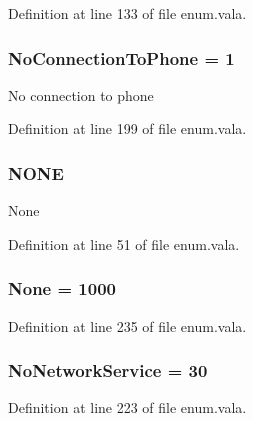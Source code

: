 Definition at line 133 of file enum.\-vala.

\hypertarget{enum_8vala_a3ae63a7c17bbbdb719add34f0b8e1d38}{
\subsubsection[{No\-Connection\-To\-Phone}]{\setlength{\rightskip}{0pt plus 5cm}No\-Connection\-To\-Phone = 1}}\label{enum_8vala_a3ae63a7c17bbbdb719add34f0b8e1d38}
No connection to phone 

Definition at line 199 of file enum.\-vala.

\hypertarget{enum_8vala_a899caa602e4fff675b17cdbab33607ec}{
\subsubsection[{N\-O\-N\-E}]{\setlength{\rightskip}{0pt plus 5cm}N\-O\-N\-E}}\label{enum_8vala_a899caa602e4fff675b17cdbab33607ec}
None 

Definition at line 51 of file enum.\-vala.

\hypertarget{enum_8vala_ac7485dcc8d256a6f197ed7802687f252}{
\subsubsection[{None}]{\setlength{\rightskip}{0pt plus 5cm}None = 1000}}\label{enum_8vala_ac7485dcc8d256a6f197ed7802687f252}


Definition at line 235 of file enum.\-vala.

\hypertarget{enum_8vala_a941770a50c4e4f7a763fe278de42596a}{
\subsubsection[{No\-Network\-Service}]{\setlength{\rightskip}{0pt plus 5cm}No\-Network\-Service = 30}}\label{enum_8vala_a941770a50c4e4f7a763fe278de42596a}


Definition at line 223 of file enum.\-vala.

